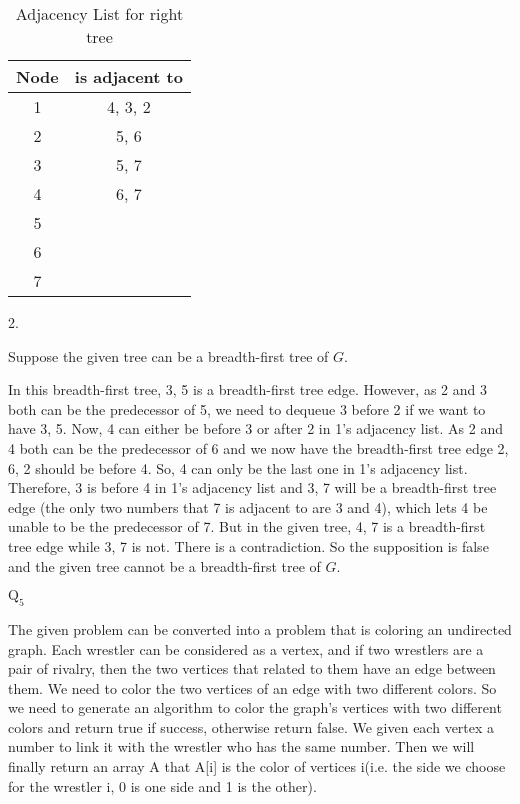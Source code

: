\documentclass[12pt]{article}
\begin{document}
\begin{table}[h]
    \centering
    \begin{tabular}{c|c}
        Node & is adjacent to \\ \hline
        1    & 4, 3, 2  \\
        2    & 5, 6   \\
        3    & 5, 7  \\
        4    & 6, 7   \\
        5    &       \\
        6    &       \\
        7    &       
    \end{tabular}
    \caption{Adjacency List for right tree}
\end{table}

2.

Suppose the given tree can be a breadth-first tree of $G$.

In this breadth-first tree, {3, 5} is a breadth-first tree edge. However, as 2 and 3 both can be the predecessor of 5, we need to dequeue 3 before 2 if we want to have {3, 5}. Now, 4 can either be before 3 or after 2 in 1's adjacency list. As 2 and 4 both can be the predecessor of 6 and we now have the breadth-first tree edge {2, 6}, 2 should be before 4. So, 4 can only be the last one in 1's adjacency list. Therefore, 3 is before 4 in  1's adjacency list and {3, 7} will be a breadth-first tree edge (the only two numbers that 7 is adjacent to are 3 and 4), which lets 4 be unable to be the predecessor of 7. But in the given tree, {4, 7} is a breadth-first tree edge while {3, 7} is not. There is a contradiction. So the supposition is false and the given tree cannot be a breadth-first tree of $G$.

\newpage
$\text{Q}_{5}$

The given problem can be converted into a problem that is coloring an undirected graph. Each wrestler can be considered as a vertex, and if two wrestlers are a pair of rivalry, then the two vertices that related to them have an edge between them. We need to color the two vertices of an edge with two different colors. So we need to generate an algorithm to color the graph's vertices with two different colors and return true if success, otherwise return false. We given each vertex a number to link it with the wrestler who has the same number. Then we will finally return an array A that A[i] is the
color of vertices i(i.e. the side we choose for the wrestler i, 0 is one side and 1 is the other).
\end{document}
